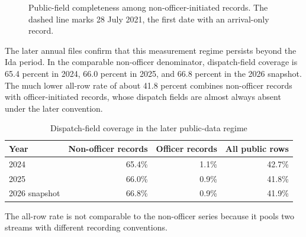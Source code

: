 \documentclass[11pt]{article}
\begin{document}
\begin{figure}[!htbp]
\centering
{}
\caption{Public-field completeness among non-officer-initiated records. The dashed line marks 28 July 2021, the first date with an arrival-only record.}
\label{fig:monthly}
\end{figure}

The later annual files confirm that this measurement regime persists beyond the Ida period. In the comparable non-officer denominator, dispatch-field coverage is 65.4 percent in 2024, 66.0 percent in 2025, and 66.8 percent in the 2026 snapshot. The much lower all-row rate of about 41.8 percent combines non-officer records with officer-initiated records, whose dispatch fields are almost always absent under the later convention.

\begin{table}[!htbp]
\centering
\caption{Dispatch-field coverage in the later public-data regime}
\label{tab:current}
\begin{tabular}{@{}lrrr@{}}
\toprule
Year & Non-officer records & Officer records & All public rows \\
\midrule
2024 & 65.4\% & 1.1\% & 42.7\% \\
2025 & 66.0\% & 0.9\% & 41.8\% \\
2026 snapshot & 66.8\% & 0.9\% & 41.9\% \\
\bottomrule
\end{tabular}
\begin{minipage}{0.96\textwidth}\footnotesize
The all-row rate is not comparable to the non-officer series because it pools two streams with different recording conventions.
\end{minipage}
\end{table}
\end{document}
